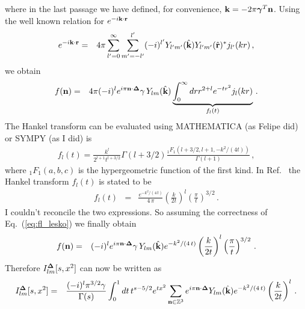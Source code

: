 	where in the last passage we have defined, for convenience, ${\bf k}=-2\pi{\bm \gamma}^T{\bf n}$. Using the well known relation for $e^{-i{\bf k}\cdot{\bf r}}$
	\begin{eqnarray}
	e^{-i{\bf k}\cdot{\bf r}}&=&4\pi\sum_{l^\prime=0}^{\infty}\sum_{m^\prime=-l^\prime}^{l^\prime}(-i)^{l^\prime}Y_{l^\prime m^\prime}({\hat {\bf k}})Y_{l^\prime m^\prime}(\hat{{\bf r}})^*j_{l^\prime}(kr)\, ,
	\end{eqnarray}
	we obtain
	\begin{eqnarray}
	f({\bf n})&=&4\pi (-i)^le^{i\pi{\bf n}\cdot{\bf\Delta}}\gamma\, Y_{lm}(\hat{{\bf k}})\underbrace{\int_0^\infty dr r^{2+l} e^{-tr^2}j_l(kr)}_{f_l(t)}\, .\label{eq:fn_final}
	\end{eqnarray}
	{\color{red}
	The Hankel transform can be evaluated using MATHEMATICA (as Felipe did) or SYMPY (as I did) is
	\begin{eqnarray}
	f_l(t)=\frac{k^l}{2^{l+1}t^{l+3/2}}\Gamma(l+3/2)\frac{_1F_1(l+3/2,l+1,-k^2/(4t))}{\Gamma(l+1)}\, ,
	\end{eqnarray}
	where $_1F_1(a,b,c)$ is the hypergeometric function of the first kind.}
	In Ref.~\cite{Leskovec:2012gb} the Hankel transform $f_l(t)$ is stated to be
	\begin{eqnarray}
	f_l(t)&=&\frac{e^{-k^2/(4\,t)}}{4\,\pi}\left(\frac{k}{2t}\right)^l\left(\frac{\pi}{t}\right)^{3/2}\, .\label{eq:fl_lesko}
	\end{eqnarray}
	{\color{red}I couldn't reconcile the two expressions}. So assuming the correctness of Eq.~(\ref{eq:fl_lesko}) we finally obtain
	\begin{eqnarray}
	f({\bf n})&=&(-i)^le^{i\pi{\bf n}\cdot{\bf\Delta}}\gamma\, Y_{lm}(\hat{{\bf k}})e^{-k^2/(4\,t)}\left(\frac{k}{2t}\right)^l\left(\frac{\pi}{t}\right)^{3/2}\, .
	\end{eqnarray}
	Therefore $I^{\bf\Delta}_{lm}[s,x^2]$ can now be written as
	\begin{eqnarray}
		I^{\bf\Delta}_{lm}[s,x^2]&=&\frac{(-i)^l\pi^{3/2}\gamma}{\Gamma(s)}\int_0^1dt\,t^{s-5/2}e^{tx^2}\sum_{{\bf n}\in\mathbb{Z}^3}e^{i\pi{\bf n}\cdot{\bf \Delta}}Y_{lm}(\hat{\bf k})e^{-k^2/(4\,t)}\left(\frac{k}{2t}\right)^l\, .
	\end{eqnarray}
